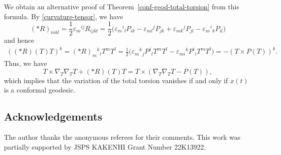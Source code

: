 \documentclass[pdftex]{sigma}
\numberwithin{equation}{section}
\begin{document}
We obtain an alternative proof of Theorem~\ref{conf-geod-total-torsion} from this formula.
By \eqref{curvature-tensor},
we have
\[
(*R)_{mkl}=\frac{1}{2}\varepsilon_m{}^{ij}R_{ijkl}
=\frac{1}{2}\bigl(\varepsilon_m{}^i{}_l P_{ik}-\varepsilon_{ml}{}^j P_{jk}
+\varepsilon_{mk}{}^j P_{jl}-\varepsilon_m{}^i{}_k P_{il}\bigr)
\]
and hence
\begin{align*}
((*R)(T)T)^k =(*R)_m{}^k{}_lT^m T^l
 =\frac{1}{2}\bigl(\varepsilon_m{}^k{}_jP^j{}_l T^m T^l-\varepsilon_{mi}{}^kP^i{}_l T^mT^l\bigr)
 =-(T\times P(T))^k.
\end{align*}
Thus, we have
\[
T\times \nabla_T\nabla_T T+(*R)(T)T=
T\times (\nabla_T \nabla_T T-P(T)),
\]
which implies that the variation of the total torsion vanishes if and only if $x(t)$ is a conformal geodesic.

\subsection*{Acknowledgements}
The author thanks the anonymous referees for their comments.
This work was partially supported by JSPS KAKENHI Grant Number 22K13922.
\end{document}
